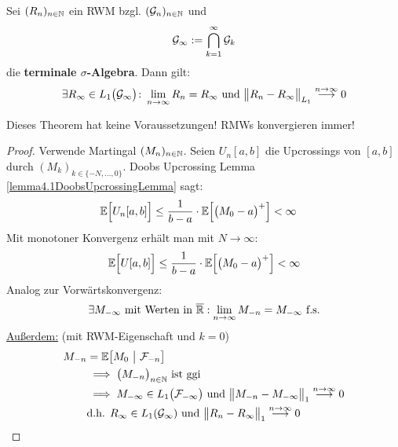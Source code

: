 \begin{theorem}\label{theorem5.5KonvergenzVonRWMs}\enter
Sei $(R_n)_{n\in\mathbb{N}}$ ein RWM bzgl. $(\mathcal{G}_n)_{n\in\mathbb{N}}$ und 
\begin{align*}
\mathcal{G}_\infty:=\bigcap\limits_{k=1}^\infty\mathcal{G}_k
\end{align*}
die \textbf{terminale $\sigma$-Algebra}. Dann gilt:
\begin{align*}
	\exists R_\infty\in L_1\big(\mathcal{G}_\infty\big)\colon\lim\limits_{n\to\infty} R_n=R_\infty \text{ und } \big\Vert R_n-R_\infty\big\Vert_{L_1}\stackrel{n\to\infty}{\longrightarrow}0
\end{align*}
\end{theorem}

\begin{bemerkung}
Dieses Theorem hat keine Voraussetzungen! RMWs konvergieren immer!
\end{bemerkung}

\begin{proof}
	Verwende Martingal $(M_n)_{n\in\mathbb{N}}$. Seien $U_n [ a,b]$ die Upcrossings von $[ a,b]$ durch $(M_k)_{k\in\lbrace-N,\ldots,0\rbrace}$. Doobs Upcrossing Lemma \ref{lemma4.1DoobsUpcrossingLemma} sagt:
\begin{align*}
	\mathbb{E}\Big[U_n[ a,b]\Big]
&\leq
\frac{1}{b-a}\cdot\mathbb{E}\Big[\big(M_0-a\big)^+\Big]<\infty
\end{align*}
Mit monotoner Konvergenz erhält man mit $N\to\infty$:
\begin{align*}
	\mathbb{E}\Big[U[a,b]\Big]\leq\frac{1}{b-a}\cdot\mathbb{E}\Big[\big(M_0-a\big)^+\Big]<\infty
\end{align*}
Analog zur Vorwärtskonvergenz:
\begin{align*}
\exists M_{-\infty}\text{ mit Werten in }\overline{\mathbb{R}}:\lim\limits_{n\to\infty} M_{-n}=M_{-\infty}\text{ f.s.}
\end{align*}
\ul{Außerdem:} (mit RWM-Eigenschaft und $k=0$)
\begin{align*}
M_{-n}
&=\mathbb{E}\big[M_0~\big|~\mathcal{F}_{-n}\big]\\
&\implies \big(M_{-n}\big)_{n\in\mathbb{N}}\text{ ist ggi}\\
&\implies M_{-\infty}\in L_1\big(\mathcal{F}_{-\infty}\big)\text{ und }\big\Vert M_{-n}-M_{-\infty}\big\Vert_1\stackrel{n\to\infty}{\longrightarrow}0\\
&\text{d.h. }R_\infty\in L_1(\mathcal{G}_\infty)\text{ und }\big\Vert R_n-R_\infty\big\Vert_1\stackrel{n\to\infty}{\longrightarrow}0
\end{align*}
\end{proof}

